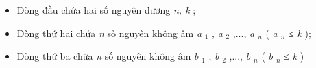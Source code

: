 \begin{itemize}
	\item Dòng đầu chứa hai số nguyên dương \emph{ n, k } ;
	\item Dòng thứ hai chứa \emph{ n } số nguyên không âm \emph{ a }$_ 1 $ , \emph{ a }$_ 2 $ ,..., \emph{ a $_ n $} ( \emph{ a $_ n $} ≤ \emph{ k } );
	\item Dòng thứ ba chứa \emph{ n } số nguyên không âm \emph{ b }$_ 1 $ , \emph{ b }$_ 2 $ ,..., \emph{ b $_ n $} ( \emph{ b $_ n $} ≤ \emph{ k } )
\end{itemize}